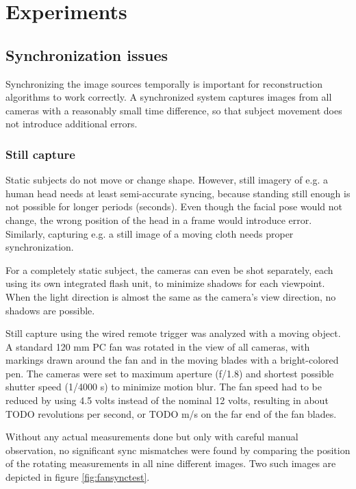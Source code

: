 \section{Experiments}


\subsection{Synchronization issues}

Synchronizing the image sources temporally is important for reconstruction algorithms to work correctly.
A synchronized system captures images from all cameras with a reasonably small time difference, so that subject movement does not introduce additional errors.

\subsubsection{Still capture}

Static subjects do not move or change shape.
However, still imagery of e.g. a human head needs at least semi-accurate syncing, because standing still enough is not possible for longer periods (seconds).
Even though the facial pose would not change, the wrong position of the head in a frame would introduce error.
Similarly, capturing e.g. a still image of a moving cloth needs proper synchronization.

For a completely static subject, the cameras can even be shot separately, each using its own integrated flash unit, to minimize shadows for each viewpoint.
When the light direction is almost the same as the camera's view direction, no shadows are possible.

Still capture using the wired remote trigger was analyzed with a moving object.
A standard 120 mm PC fan was rotated in the view of all cameras, with markings drawn around the fan and in the moving blades with a bright-colored pen.
The cameras were set to maximum aperture (f/1.8) and shortest possible shutter speed (1/4000 s) to minimize motion blur.
The fan speed had to be reduced by using 4.5 volts instead of the nominal 12 volts, resulting in about TODO revolutions per second, or TODO m/s on the far end of the fan blades.

Without any actual measurements done but only with careful manual observation, no significant sync mismatches were found by comparing the position of the rotating measurements in all nine different images.
Two such images are depicted in figure \ref{fig:fansynctest}.

